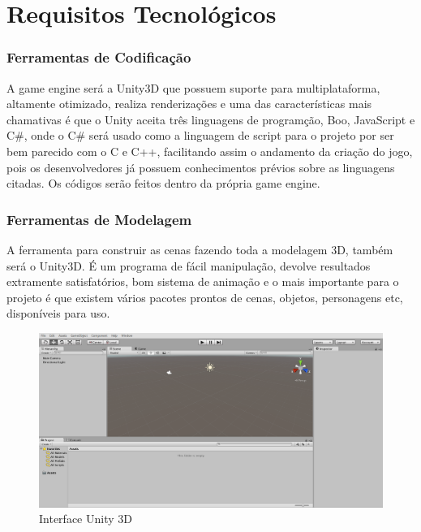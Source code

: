 \part{Requisitos Tecnol\'ogicos}
\section{Ferramentas de Codificação}

A game engine será a Unity3D que possuem suporte para multiplataforma, altamente otimizado, realiza renderizações e uma das características mais chamativas é que o Unity aceita três linguagens de programção, Boo, JavaScript e C\#, onde o C\# ser\'a usado como a linguagem de script para o projeto por ser bem parecido com o C e C++, facilitando assim o andamento da criação do jogo, pois os desenvolvedores j\'a possuem conhecimentos pr\'evios sobre as linguagens citadas. Os c\'odigos ser\~ao feitos dentro da própria game engine.


\section{Ferramentas de Modelagem}

A ferramenta para construir as cenas fazendo toda a modelagem 3D, também será o Unity3D. \'E um programa de f\'acil manipula\c{c}\~ao, devolve resultados extramente satisfat\'orios, bom sistema de anima\c{c}\~ao e o mais importante para o projeto é que existem vários pacotes prontos de cenas, objetos, personagens etc, disponíveis para uso.

\begin{figure}[!h]
	\centering
		\includegraphics[scale=0.3]{figuras/unity}
	\caption{Interface Unity 3D}
\end{figure}